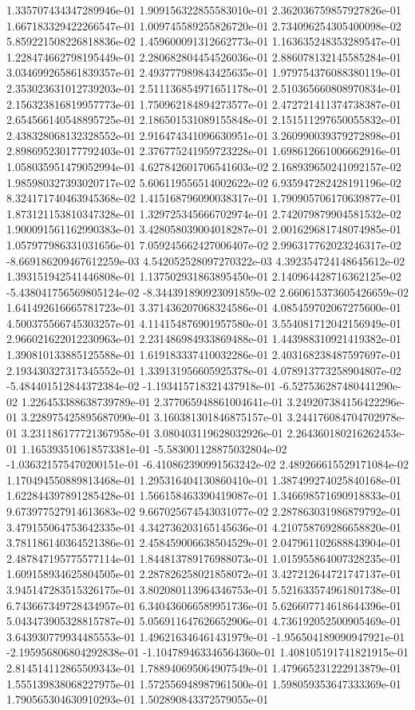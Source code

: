 1.335707434347289946e-01	1.909156322855583010e-01	2.362036759857927826e-01	1.667183329422266547e-01	1.009745589255826720e-01	2.734096254305400098e-02	5.859221508226818836e-02	1.459600091312662773e-01	1.163635248353289547e-01	1.228474662798195449e-01	2.280682804454526036e-01	2.886078132145585284e-01	3.034699265861839357e-01	2.493777989843425635e-01	1.979754376088380119e-01	2.353023631012739203e-01	2.511136854971651178e-01	2.510365660808970834e-01	2.156323816819957773e-01	1.750962184894273577e-01	2.472721411374738387e-01	2.654566140548895725e-01	2.186501531089155848e-01	2.151511297650055832e-01	2.438328068132328552e-01	2.916474341096630951e-01	3.260990039379272898e-01	2.898695230177792403e-01	2.376775241959723228e-01	1.698612661006662916e-01	1.058035951479052994e-01	4.627842601706541603e-02	2.168939650241092157e-02	1.985980327393020717e-02	5.606119556514002622e-02	6.935947282428191196e-02	8.324171740463945368e-02	1.415168796090038317e-01	1.790905706170639877e-01	1.873121153810347328e-01	1.329725345666702974e-01	2.742079879904581532e-02	1.900091561162990383e-01	3.428058039004018287e-01	2.001629681748074985e-01	1.057977986331031656e-01	7.059245662427006407e-02	2.996317762023246317e-02	-8.669186209467612259e-03	4.542052528097270322e-03	4.392354724148645612e-02	1.393151942541446808e-01	1.137502931863895450e-01	2.140964428716362125e-02	-5.438041756569805124e-02	-8.344391890923091859e-02	2.660615373605426659e-02	1.641492616665781723e-01	3.371436207068324586e-01	4.085459702067275600e-01	4.500375566745303257e-01	4.114154876901957580e-01	3.554081712042156949e-01	2.966021622012230963e-01	2.231486984933869488e-01	1.443988310921419382e-01	1.390810133885125588e-01	1.619183337410032286e-01	2.403168238487597697e-01	2.193430327317345552e-01	1.339131956605925378e-01	4.078913773258904807e-02	-5.484401512844372384e-02	-1.193415718321437918e-01	-6.527536287480441290e-02	1.226453388638739789e-01	2.377065948861004641e-01	3.249207384156422296e-01	3.228975425895687090e-01	3.160381301846875157e-01	3.244176084704702978e-01	3.231186177721367958e-01	3.080403119628032926e-01	2.264360180216262453e-01	1.165393510618573381e-01	-5.583001128875032804e-02	-1.036321575470200151e-01	-6.410862390991563242e-02	2.489266615529171084e-02	1.170494550889813468e-01	1.295316404130860410e-01	1.387499274025840168e-01	1.622844397891285428e-01	1.566158463390419087e-01	1.346698571690918833e-01	9.673977527914613683e-02	9.667025674543031077e-02	2.287863031986879792e-01	3.479155064753642335e-01	4.342736203165145636e-01	4.210758769286658820e-01	3.781186140364521386e-01	2.458459006638504529e-01	2.047961102688843904e-01	2.487847195775577114e-01	1.844813789176988073e-01	1.015955864007328235e-01	1.609158934625804505e-01	2.287826258021858072e-01	3.427212644721747137e-01	3.945147283515326175e-01	3.802080113964346753e-01	5.521633574961801738e-01	6.743667349728434957e-01	6.340436066589951736e-01	5.626607714618644396e-01	5.043473905328815787e-01	5.056911647626652906e-01	4.736192052500905469e-01	3.643930779934485553e-01	1.496216346461431979e-01	-1.956504189090947921e-01	-2.195956806804292838e-01	-1.104789463346564360e-01	1.408105191741821915e-01	2.814514112865509343e-01	1.788940695064907549e-01	1.479665231222913879e-01	1.555139838068227975e-01	1.572556948987961500e-01	1.598059353647333369e-01	1.790565304630910293e-01	1.502890843372579055e-01